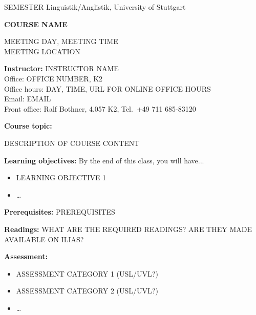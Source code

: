 \documentclass[12pt,fleqn,a4]{extarticle}
\newcommand{\6}{\mbox{$[\hspace*{-.6mm}[$}}
\newcommand{\9}{\mbox{$]\hspace*{-.6mm}]$}}
\begin{document}
SEMESTER \hfill Linguistik/Anglistik, University of Stuttgart

\begin{center}

{\bf \large COURSE NAME}


MEETING DAY, MEETING TIME
\\ 
MEETING LOCATION

\end{center}



{\bf Instructor:} INSTRUCTOR NAME
\\ Office: OFFICE NUMBER, K2  \\
Office hours: DAY, TIME, URL FOR ONLINE OFFICE HOURS \\
Email: EMAIL \\
Front office: Ralf Bothner, 4.057 K2, Tel.\ +49 711 685-83120

\medskip

{\bf Course topic:} 

DESCRIPTION OF COURSE CONTENT

\medskip

{\bf Learning objectives:} By the end of this class, you will have...

\begin{itemize}[topsep=-1ex,itemsep=-5pt]

\item LEARNING OBJECTIVE 1

\item \ldots

\end{itemize}

\medskip

{\bf Prerequisites:} PREREQUISITES

\medskip

{\bf Readings:} WHAT ARE THE REQUIRED READINGS? ARE THEY MADE AVAILABLE ON ILIAS?

\medskip

{\bf Assessment:} 

\begin{itemize}[topsep=-1ex,itemsep=-1pt]

\item ASSESSMENT CATEGORY 1 (USL/UVL?)

\item ASSESSMENT CATEGORY 2 (USL/UVL?)

\item \ldots

\end{itemize}
\end{document}
